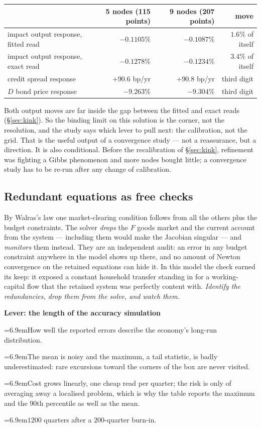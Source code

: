\documentclass[10pt,a4paper]{article}
\newcommand{\leverrow}[2]{\par\noindent\hangindent=6.9em\hangafter=1\makebox[6.9em][l]{\textit{#1}}#2}
\newenvironment{lever}[1]{\par\begin{framed}\small\noindent\textcolor{levcol}{\textbf{Lever: #1}}\par\vspace{2pt}}{\end{framed}}
\theoremstyle{plain}
\theoremstyle{remark}
\begin{document}
\begin{center}\small
\begin{tabular}{@{}lrrr@{}}
\toprule
 & 5 nodes (115 points) & 9 nodes (207 points) & move \\
\midrule
impact output response, fitted read & $-0.1105\%$ & $-0.1087\%$ & $1.6\%$ of itself \\
impact output response, exact read & $-0.1278\%$ & $-0.1234\%$ & $3.4\%$ of itself \\
credit spread response & $+90.6$ bp/yr & $+90.8$ bp/yr & third digit \\
$D$ bond price response & $-9.263\%$ & $-9.304\%$ & third digit \\
\bottomrule
\end{tabular}
\end{center}

\noindent Both output moves are far inside the gap between the fitted and exact reads
(\S\ref{sec:kink}). So the binding limit on this solution is the corner, not the resolution, and the
study says which lever to pull next: the calibration, not the grid. That is the useful output of a
convergence study --- not a reassurance, but a direction. It is also conditional. Before the
recalibration of \S\ref{sec:kink}, refinement was fighting a Gibbs phenomenon and more nodes bought
little; a convergence study has to be re-run after any change of calibration.

\subsection{Redundant equations as free checks}

By Walras's law one market-clearing condition follows from all the others plus the budget
constraints. The solver \emph{drops} the $F$ goods market and the current account from the system ---
including them would make the Jacobian singular --- and \emph{monitors} them instead. They are an
independent audit: an error in any budget constraint anywhere in the model shows up there, and no
amount of Newton convergence on the retained equations can hide it. In this model the check earned
its keep: it exposed a constant household transfer standing in for a working-capital flow that the
retained system was perfectly content with. \emph{Identify the redundancies, drop them from the solve,
and watch them.}

\begin{lever}{the length of the accuracy simulation}
\leverrow{Controls}{How well the reported errors describe the economy's long-run distribution.}
\leverrow{Push short}{The mean is noisy and the maximum, a tail statistic, is badly underestimated:
rare excursions toward the corners of the box are never visited.}
\leverrow{Push long}{Cost grows linearly, one cheap read per quarter; the risk is only of averaging
away a localised problem, which is why the table reports the maximum and the 90th percentile as well
as the mean.}
\leverrow{Here}{$1200$ quarters after a $200$-quarter burn-in.}
\end{lever}
\end{document}
